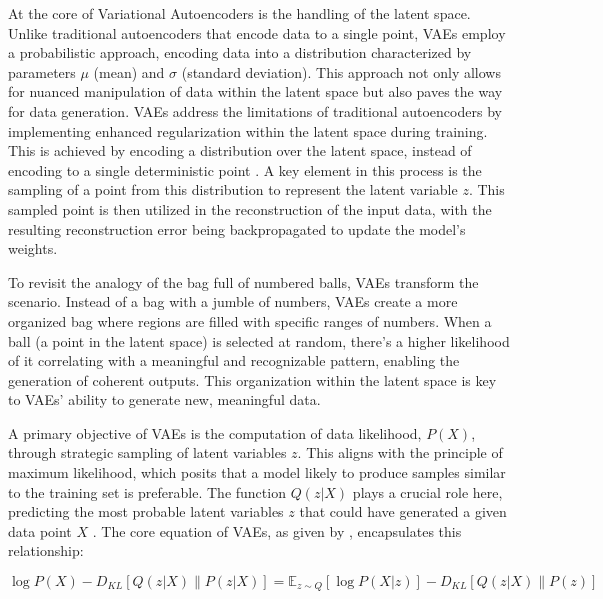 At the core of Variational Autoencoders is the handling of the latent space. Unlike traditional autoencoders that encode data to a single point, VAEs employ a probabilistic approach, encoding data into a distribution characterized by parameters \(\mu\) (mean) and \(\sigma\) (standard deviation). This approach not only allows for nuanced manipulation of data within the latent space but also paves the way for data generation. VAEs address the limitations of traditional autoencoders by implementing enhanced regularization within the latent space during training. This is achieved by encoding a distribution over the latent space, instead of encoding to a single deterministic point \citep{doerschVAE}. A key element in this process is the sampling of a point from this distribution to represent the latent variable \(z\). This sampled point is then utilized in the reconstruction of the input data, with the resulting reconstruction error being backpropagated to update the model's weights.

To revisit the analogy of the bag full of numbered balls, VAEs transform the scenario. Instead of a bag with a jumble of numbers, VAEs create a more organized bag where regions are filled with specific ranges of numbers. When a ball (a point in the latent space) is selected at random, there's a higher likelihood of it correlating with a meaningful and recognizable pattern, enabling the generation of coherent outputs. This organization within the latent space is key to VAEs' ability to generate new, meaningful data.

A primary objective of VAEs is the computation of data likelihood, \(P(X)\), through strategic sampling of latent variables \(z\). This aligns with the principle of maximum likelihood, which posits that a model likely to produce samples similar to the training set is preferable. The function \(Q(z|X)\) plays a crucial role here, predicting the most probable latent variables \(z\) that could have generated a given data point \(X\) \citep{doerschVAE}. The core equation of VAEs, as given by \citeauthor{doerschVAE}, encapsulates this relationship:

\[
\log P(X) - D_{KL} \left[ Q(z|X) \parallel P(z|X) \right] = \mathbb{E}_{z \sim Q} \left[ \log P(X|z) \right] - D_{KL} \left[ Q(z|X) \parallel P(z) \right]
\]

